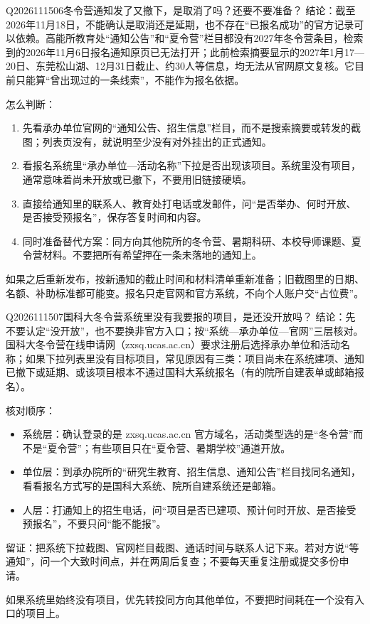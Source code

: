 \begin{qa}{Q2026111506}{冬令营通知发了又撤下，是取消了吗？还要不要准备？}
结论：截至2026年11月18日，不能确认是取消还是延期，也不存在“已报名成功”的官方记录可以依赖。高能所教育处“通知公告”和“夏令营”栏目都没有2027年冬令营条目，检索到的2026年11月6日报名通知原页已无法打开；此前检索摘要显示的2027年1月17—20日、东莞松山湖、12月31日截止、约30人等信息，均无法从官网原文复核。它目前只能算“曾出现过的一条线索”，不能作为报名依据。

怎么判断：

\begin{enumerate}
\item 先看承办单位官网的“通知公告、招生信息”栏目，而不是搜索摘要或转发的截图；列表页没有，就说明至少没有对外挂出的正式通知。
\item 看报名系统里“承办单位—活动名称”下拉是否出现该项目。系统里没有项目，通常意味着尚未开放或已撤下，不要用旧链接硬填。
\item 直接给通知里的联系人、教育处打电话或发邮件，问“是否举办、何时开放、是否接受预报名”，保存答复时间和内容。
\item 同时准备替代方案：同方向其他院所的冬令营、暑期科研、本校导师课题、夏令营材料。不要把所有希望押在一条未落地的通知上。
\end{enumerate}

如果之后重新发布，按新通知的截止时间和材料清单重新准备；旧截图里的日期、名额、补助标准都可能变。报名只走官网和官方系统，不向个人账户交“占位费”。
\end{qa}

\begin{qa}{Q2026111507}{国科大冬令营系统里没有我要报的项目，是还没开放吗？}
结论：先不要认定“没开放”，也不要换非官方入口；按“系统—承办单位—官网”三层核对。国科大冬令营在线申请网（zxsq.ucas.ac.cn）要求注册后选择承办单位和活动名称；如果下拉列表里没有目标项目，常见原因有三类：项目尚未在系统建项、通知已撤下或延期、或该项目根本不通过国科大系统报名（有的院所自建表单或邮箱报名）。

核对顺序：

\begin{itemize}
\item 系统层：确认登录的是 zxsq.ucas.ac.cn 官方域名，活动类型选的是“冬令营”而不是“夏令营”；有些项目只在“夏令营、暑期学校”通道开放。
\item 单位层：到承办院所的“研究生教育、招生信息、通知公告”栏目找同名通知，看看报名方式写的是国科大系统、院所自建系统还是邮箱。
\item 人层：打通知上的招生电话，问“项目是否已建项、预计何时开放、是否接受预报名”，不要只问“能不能报”。
\end{itemize}

留证：把系统下拉截图、官网栏目截图、通话时间与联系人记下来。若对方说“等通知”，问一个大致时间点，并在两周后复查；不要每天重复注册或提交多份申请。

如果系统里始终没有项目，优先转投同方向其他单位，不要把时间耗在一个没有入口的项目上。
\end{qa}
